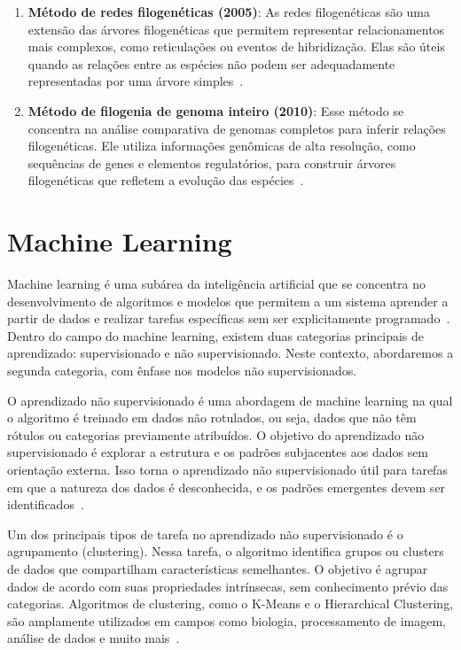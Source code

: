 \begin{enumerate}
  \item \textbf{Método de redes filogenéticas (2005)}: As redes filogenéticas são uma extensão das árvores filogenéticas que permitem representar relacionamentos mais complexos, como reticulações ou eventos de hibridização. Elas são úteis quando as relações entre as espécies não podem ser adequadamente representadas por uma árvore simples~\cite{huson_phylogenetic_networks_2006}.
  \item \textbf{Método de filogenia de genoma inteiro (2010)}: Esse método se concentra na análise comparativa de genomas completos para inferir relações filogenéticas. Ele utiliza informações genômicas de alta resolução, como sequências de genes e elementos regulatórios, para construir árvores filogenéticas que refletem a evolução das espécies~\cite{eisen_horizontal_gene_transfre_2000}.
\end{enumerate}

\section{Machine Learning}
Machine learning é uma subárea da inteligência artificial que se concentra no desenvolvimento de algoritmos e modelos que permitem a um sistema aprender a partir de dados e realizar tarefas específicas sem ser explicitamente programado~\cite{deeplearning_goodfellow_2016}. Dentro do campo do machine learning, existem duas categorias principais de aprendizado: supervisionado e não supervisionado. Neste contexto, abordaremos a segunda categoria, com ênfase nos modelos não supervisionados.

O aprendizado não supervisionado é uma abordagem de machine learning na qual o algoritmo é treinado em dados não rotulados, ou seja, dados que não têm rótulos ou categorias previamente atribuídos. O objetivo do aprendizado não supervisionado é explorar a estrutura e os padrões subjacentes aos dados sem orientação externa. Isso torna o aprendizado não supervisionado útil para tarefas em que a natureza dos dados é desconhecida, e os padrões emergentes devem ser identificados~\cite{machine_learning_bishop_2006}.

Um dos principais tipos de tarefa no aprendizado não supervisionado é o agrupamento (clustering). Nessa tarefa, o algoritmo identifica grupos ou clusters de dados que compartilham características semelhantes. O objetivo é agrupar dados de acordo com suas propriedades intrínsecas, sem conhecimento prévio das categorias. Algoritmos de clustering, como o K-Means e o Hierarchical Clustering, são amplamente utilizados em campos como biologia, processamento de imagem, análise de dados e muito mais~\cite{machine_learning_bishop_2006}.

